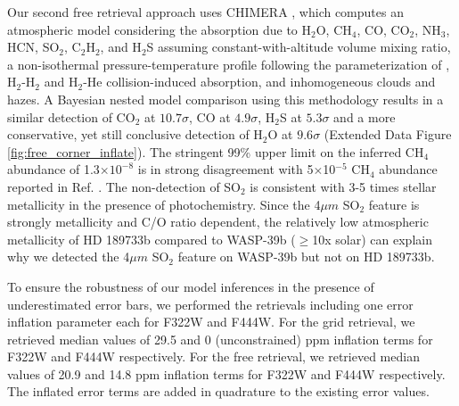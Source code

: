 \documentclass[sn-standardnature]{sn-jnl}%
\begin{document}
Our second free retrieval approach uses CHIMERA \cite{line_systematic_2013}, which computes an atmospheric model considering the absorption due to H$_2$O, CH$_4$,  CO, CO$_2$, NH$_3$, HCN, SO$_2$, C$_2$H$_2$, and H$_2$S assuming constant-with-altitude volume mixing ratio, a non-isothermal pressure-temperature profile following the parameterization of \cite{parmentier_non-grey_2014}, H$_2$-H$_2$ and H$_2$-He collision-induced absorption, and inhomogeneous clouds and hazes. A Bayesian nested model comparison using this methodology results in a similar detection of CO$_2$ at $10.7\sigma$, CO at $4.9\sigma$, H$_2$S at $5.3\sigma$ and a more conservative, yet still conclusive detection of H$_2$O at $9.6\sigma$ (Extended Data Figure \ref{fig:free_corner_inflate}). The stringent 99\% upper limit on the inferred CH$_4$ abundance of 1.3$\times10^{-8}$ is in strong disagreement with 5$\times$10$^{-5}$ CH$_4$ abundance reported in Ref. \cite{swain_presence_2008}. The non-detection of SO$_2$ is consistent with 3-5 times stellar metallicity in the presence of photochemistry. Since the 4$\mu m$ SO$_2$ feature is strongly metallicity \cite{tsai_photochemically_2023} and C/O ratio \cite{polman_h_2023} dependent, the relatively low atmospheric metallicity of HD 189733b compared to WASP-39b ($\geq$10x solar) can explain why we detected the 4$\mu m$ SO$_2$ feature on WASP-39b \cite{powell_sulfur_2024} but not on HD 189733b. 

To ensure the robustness of our model inferences in the presence of underestimated error bars, we performed the retrievals including one error inflation parameter each for F322W and F444W. For the grid retrieval, we retrieved median values of  29.5 and 0 (unconstrained) ppm inflation terms for F322W and F444W respectively. For the free retrieval, we retrieved median values of 20.9 and 14.8 ppm inflation terms for F322W and F444W respectively. The inflated error terms are added in quadrature to the existing error values. 
\end{document}
